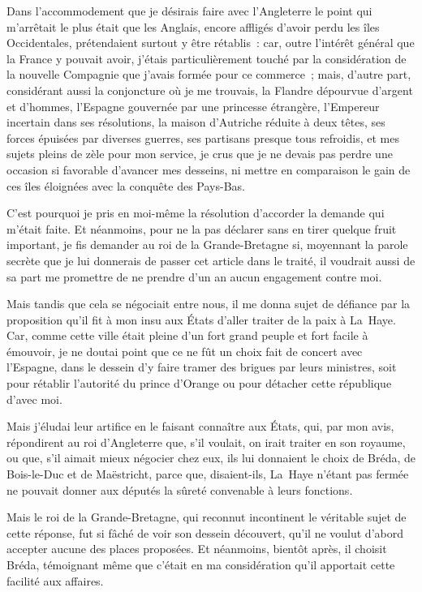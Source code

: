 \documentclass[french,twoside]{book} %
\begin{document}
Dans l’accommodement que je désirais faire avec l’Angleterre le point qui m’arrêtait le plus était que les Anglais, encore affligés d’avoir perdu les îles Occidentales, prétendaient surtout y être rétablis : car, outre l’intérêt général que la France y pouvait avoir, j’étais particulièrement touché par la considération de la nouvelle Compagnie que j’avais formée pour ce commerce ; mais, d’autre part, considérant aussi la conjoncture où je me trouvais, la Flandre dépourvue d’argent et d’hommes, l’Espagne gouvernée par une princesse étrangère, l’Empereur incertain dans ses résolutions, la maison d’Autriche réduite à deux têtes, ses forces épuisées par diverses guerres, ses partisans presque tous refroidis, et mes sujets pleins de zèle pour mon service, je crus que je ne devais pas perdre une occasion si favorable d’avancer mes desseins, ni mettre en comparaison le gain de ces îles éloignées avec la conquête des Pays-Bas.\par
C’est pourquoi je pris en moi-même la résolution d’accorder la demande qui m’était faite. Et néanmoins, pour ne la pas déclarer sans en tirer quelque fruit important, je fis demander au roi de la Grande-Bretagne si, moyennant la parole secrète que je lui donnerais de passer cet article dans le traité, il voudrait aussi de sa part me promettre de ne prendre d’un an aucun engagement contre moi.\par
Mais tandis que cela se négociait entre nous, il me donna sujet de défiance par la proposition qu’il fit à mon insu aux États d’aller traiter de la paix à La Haye. Car, comme cette ville était pleine d’un fort grand peuple et fort facile à émouvoir, je ne doutai point que ce ne fût un choix fait de concert avec l’Espagne, dans le dessein d’y faire tramer des brigues par leurs ministres, soit pour rétablir l’autorité du prince d’Orange ou pour détacher cette république d’avec moi.\par
Mais j’éludai leur artifice en le faisant connaître aux États, qui, par mon avis, répondirent au roi d’Angleterre que, s’il voulait, on irait traiter en son royaume, ou que, s’il aimait mieux négocier chez eux, ils lui donnaient le choix de Bréda, de Bois-le-Duc et de Maëstricht, parce que, disaient-ils, La Haye n’étant pas fermée ne pouvait donner aux députés la sûreté convenable à leurs fonctions.\par
Mais le roi de la Grande-Bretagne, qui reconnut incontinent le véritable sujet de cette réponse, fut si fâché de voir son dessein découvert, qu’il ne voulut d’abord accepter aucune des places proposées. Et néanmoins, bientôt après, il choisit Bréda, témoignant même que c’était en ma considération qu’il apportait cette facilité aux affaires.\par
\end{document}
